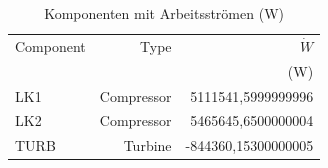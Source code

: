 \begin{longtable}{lrr}
\caption{Komponenten mit Arbeitsströmen (W)} \\
\hline
Component & Type & $\dot W$ \\
 &  & (W) \\
\hline
LK1 & Compressor & 5111541,5999999996 \\
LK2 & Compressor & 5465645,6500000004 \\
TURB & Turbine & -844360,15300000005 \\
\hline
\end{longtable}